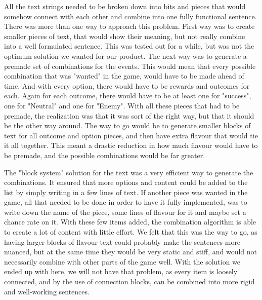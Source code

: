All the text strings needed to be broken down into bits and pieces that would somehow connect with each other and combine into one fully functional sentence. 
There was more than one way to approach this problem.
First way was to create smaller pieces of text, that would show their meaning, but not really combine into a well formulated sentence. This was tested out for a while, but was not the optimum solution we wanted for our product.
The next way was to generate a premade set of combinations for the events. This would mean that every possible combination that was "wanted" in the game, would have to be made ahead of time. And with every option, there would have to be rewards and outcomes for each. Again for each outcome, there would have to be at least one for "success", one for "Neutral" and one for "Enemy". With all these pieces that had to be premade, the realization was that it was sort of the right way, but that it should be the other way around. The way to go would be to generate smaller blocks of text for all outcome and option pieces, and then have extra flavour that would tie it all together. This meant a drastic reduction in how much flavour would have to be premade, and the possible combinations would be far greater. 

The "block system" solution for the text was a very efficient way to generate the combinations. It ensured that more options and content could be added to the list by simply writing in a few lines of text. If another piece was wanted in the game, all that needed to be done in order to have it fully implemented, was to write down the name of the piece, some lines of flavour for it and maybe set a chance rate on it. With these few items added, the combination algorithm is able to create a lot of content with little effort. 
We felt that this was the way to go, as having larger blocks of flavour text could probably make the sentences more nuanced, but at the same time they would be very static and stiff, and would not necessarily combine with other parts of the game well. With the solution we ended up with here, we will not have that problem, as every item is loosely connected, and by the use of connection blocks, can be combined into more rigid and well-working sentences.

